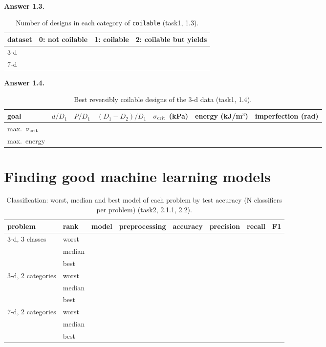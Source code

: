\documentclass[11pt]{article}
\newcommand{\sig}{\sigma_{\rm crit}}
\newcommand{\ans}[1]{\textbf{Answer #1.}}            %
\newcommand{\nb}[2]{{\small(task#1, #2)}}            %
\begin{document}
\ans{1.3} %

\begin{table}[htb]\centering\small
\caption{Number of designs in each category of \texttt{coilable} \nb{1}{1.3}.}
\begin{tabular}{@{}lccc@{}}\toprule
dataset & 0: not coilable & 1: coilable & 2: coilable but yields\\\midrule
3-d & & & \\
7-d & & & \\\bottomrule
\end{tabular}
\end{table}

\ans{1.4} %

\begin{table}[htb]\centering\small
\caption{Best reversibly coilable designs of the 3-d data \nb{1}{1.4}.}
\begin{tabular}{@{}lcccccc@{}}\toprule
goal & $d/D_1$ & $P/D_1$ & $(D_1-D_2)/D_1$ & $\sig$ (kPa) & energy (kJ/m$^3$) & imperfection (rad)\\\midrule
max.\ $\sig$ & & & & & & \\
max.\ energy & & & & & & \\\bottomrule
\end{tabular}
\end{table}

\section{Finding good machine learning models}


\begin{table}[htb]\centering\small
\caption{Classification: worst, median and best model of each problem by test accuracy (N classifiers per problem) \nb{2}{2.1.1, 2.2}.}
\begin{tabular}{@{}llllcccc@{}}\toprule
problem & rank & model & preprocessing & accuracy & precision & recall & F1\\\midrule
3-d, 3 classes & worst & & & & & & \\
 & median & & & & & & \\
 & best & & & & & & \\\midrule
3-d, 2 categories & worst & & & & & & \\
 & median & & & & & & \\
 & best & & & & & & \\\midrule
7-d, 2 categories & worst & & & & & & \\
 & median & & & & & & \\
 & best & & & & & & \\\bottomrule
\end{tabular}
\end{table}
\end{document}
